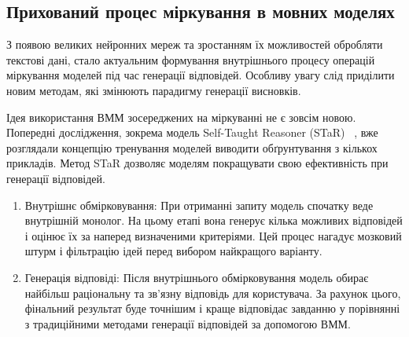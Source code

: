 \subsection{Прихований процес міркування в мовних моделях}

З появою великих нейронних мереж та зростанням їх можливостей обробляти текстові дані, стало актуальним формування внутрішнього процесу операцій міркування моделей під час генерації відповідей. Особливу увагу слід приділити новим методам, які змінюють парадигму генерації висновків.

Ідея використання ВММ зосереджених на міркуванні не є зовсім новою. Попередні дослідження, зокрема модель Self-Taught Reasoner (STaR) ~\cite{zelikman2022starbootstrappingreasoningreasoning}, вже розглядали концепцію тренування моделей виводити обґрунтування з кількох прикладів. Метод STaR дозволяє моделям покращувати свою ефективність при генерації відповідей.

\begin{enumerate}
    \item {Внутрішнє обмірковування}: При отриманні запиту модель спочатку веде внутрішній монолог. На цьому етапі вона генерує кілька можливих відповідей і оцінює їх за наперед визначеними критеріями. Цей процес нагадує мозковий штурм і фільтрацію ідей перед вибором найкращого варіанту.
    \item {Генерація відповіді}: Після внутрішнього обмірковування модель обирає найбільш раціональну та зв’язну відповідь для користувача. За рахунок цього, фінальний результат буде точнішим і краще відповідає завданню у порівнянні з традиційними методами генерації відповідей за допомогою ВММ.
\end{enumerate}

